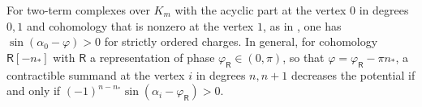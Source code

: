 For two-term complexes over $K_m$ with the acyclic part at the vertex $0$ in
degrees $0,1$ and cohomology that is nonzero at the vertex $1$, as in
\cite{wue26a,wue26b}, one has $\sin(\alpha_0-\varphi)>0$ for strictly ordered
charges. In general, for cohomology $\mathsf R[-n_*]$ with
$\mathsf R$ a representation of phase $\varphi_{\mathsf R}\in(0,\pi)$, so
that $\varphi=\varphi_{\mathsf R}-\pi n_*$, a contractible summand at the
vertex $i$ in degrees $n,n+1$ decreases the potential if and only if
$(-1)^{n-n_*}\sin(\alpha_i-\varphi_{\mathsf R})>0$.
